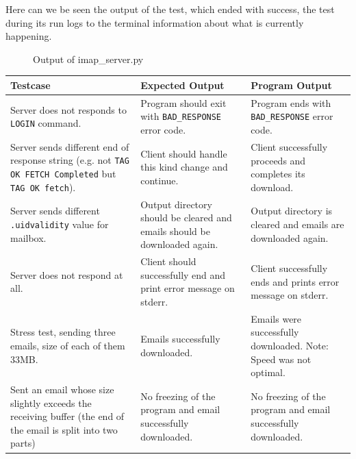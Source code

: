\documentclass[a4paper,11pt]{article}
\begin{document}
Here can we be seen the output of the test, which ended with success, 
the test during its run logs to the terminal information about what is currently happening.

\begin{figure}[H]
    \centering
    \caption{Output of imap\_server.py}
    \label{figure:imap-server}
\end{figure}

\begin{center}
    \vspace{0.5cm} %
    \begin{tabularx}{\textwidth}{|>{\raggedright\arraybackslash}p{5cm}|>{\raggedright\arraybackslash}p{5cm}|>{\raggedright\arraybackslash}X|}
        \hline
        \textbf{Testcase} & \textbf{Expected Output} & \textbf{Program Output} \\
        \hline
        Server does not responds to \texttt{LOGIN} command. & Program should exit with \texttt{BAD\_RESPONSE} error code. & Program ends with \texttt{BAD\_RESPONSE} error code. \\
        \hline
        Server sends different end of response string (e.g. not \texttt{TAG OK FETCH Completed} but \texttt{TAG OK fetch}). & Client should handle this kind change and continue. & Client successfully proceeds and completes its download. \\
        \hline
        Server sends different \texttt{.uidvalidity} value for mailbox. & Output directory should be cleared and emails should be downloaded again. & Output directory is cleared and emails are downloaded again. \\
        \hline
        Server does not respond at all. & Client should successfully end and print error message on stderr. & Client successfully ends and prints error message on stderr.  \\
        \hline
        Stress test, sending three emails, size of each of them 33MB. & Emails successfully downloaded. & Emails were successfully downloaded. Note: Speed was not optimal. \\
        \hline
        Sent an email whose size slightly exceeds the receiving buffer (the end of the email is split into two parts) & No freezing of the program and email successfully downloaded. & No freezing of the program and email successfully downloaded. \\
        \hline
    \end{tabularx}
    \vspace{0.5cm} %
\end{center}
\end{document}
